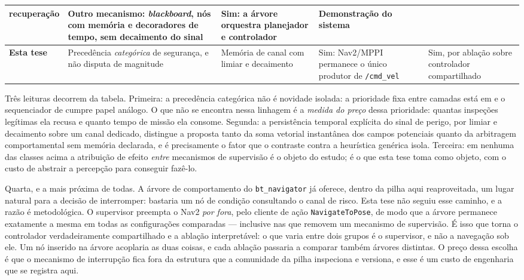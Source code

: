 \begin{table}[htb]
\begin{tabular}{p{}p{}p{}p{}p{}}
recuperação &
Outro mecanismo: \textit{blackboard}, nós com memória e decoradores de tempo, sem
decaimento do sinal &
Sim: a árvore orquestra planejador e controlador &
Demonstração do sistema\\
\hline
\textbf{Esta tese} &
Precedência \emph{categórica} de segurança, e não disputa de magnitude &
Memória de canal com limiar e decaimento &
Sim: Nav2/MPPI permanece o único produtor de \texttt{/cmd\_vel} &
Sim, por ablação sobre controlador compartilhado\\
\hline
\end{tabular}
\renewcommand{\arraystretch}{1.0}
\end{table}

Três leituras decorrem da tabela. Primeira: a precedência categórica não é novidade
isolada: a prioridade fixa entre camadas está em  e o
sequenciador de  cumpre papel análogo. O que não se encontra
nessa linhagem é a \emph{medida do preço} dessa prioridade: quantas inspeções legítimas
ela recusa e quanto tempo de missão ela consome. Segunda: a persistência temporal
explícita do sinal de perigo, por limiar e decaimento sobre um canal dedicado,
distingue a proposta tanto da soma vetorial instantânea dos campos potenciais quanto da
arbitragem comportamental sem memória declarada, e é precisamente o fator que o
contraste contra a heurística genérica isola. Terceira: em nenhuma das classes acima a
atribuição de efeito \emph{entre} mecanismos de supervisão é o objeto do estudo; é o
que esta tese toma como objeto, com o custo de abstrair a percepção para conseguir
fazê-lo.

Quarta, e a mais próxima de todas. A árvore de comportamento do \texttt{bt\_navigator}
já oferece, dentro da pilha aqui reaproveitada, um lugar natural para a decisão de
interromper: bastaria um nó de condição consultando o canal de risco. Esta tese não
seguiu esse caminho, e a razão é metodológica. O supervisor preempta o Nav2 \emph{por
fora}, pelo cliente de ação \texttt{NavigateToPose}, de modo que a árvore permanece
exatamente a mesma em todas as configurações comparadas --- inclusive nas que removem um
mecanismo de supervisão. É isso que torna o controlador verdadeiramente compartilhado e a
ablação interpretável: o que varia entre dois grupos é o supervisor, e não a navegação
sob ele. Um nó inserido na árvore acoplaria as duas coisas, e cada ablação passaria a
comparar também árvores distintas. O preço dessa escolha é que o mecanismo de
interrupção fica fora da estrutura que a comunidade da pilha inspeciona e versiona, e
esse é um custo de engenharia que se registra aqui.

